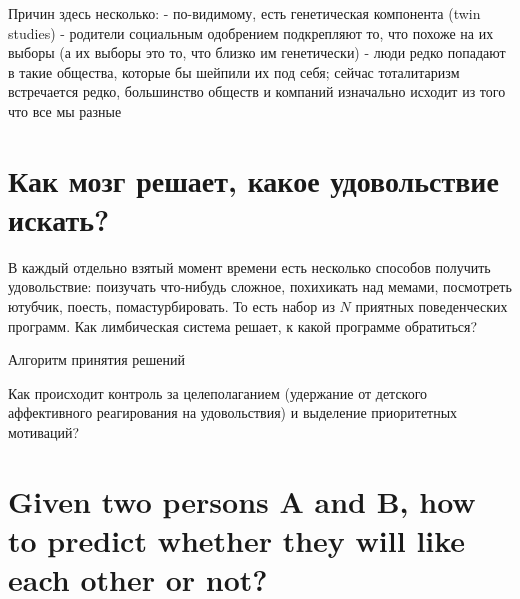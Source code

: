 \documentclass[11pt]{article}
\theoremstyle{remark}
\theoremstyle{definition}
\begin{document}
Причин здесь несколько:
- по-видимому, есть генетическая компонента (twin studies)
- родители социальным одобрением подкрепляют то, что похоже на их выборы (а их выборы это то, что близко им генетически)
- люди редко попадают в такие общества, которые бы шейпили их под себя; сейчас тоталитаризм встречается редко, большинство обществ и компаний изначально исходит из того что все мы разные












\section{Как мозг решает, какое удовольствие искать?}

В каждый отдельно взятый момент времени есть несколько способов получить удовольствие: поизучать что-нибудь сложное, похихикать над мемами, посмотреть ютубчик, поесть, помастурбировать. То есть набор из $N$ приятных поведенческих программ. Как лимбическая система решает, к какой программе обратиться? 

Алгоритм принятия решений

Как происходит контроль за целеполаганием (удержание от детского аффективного реагирования на удовольствия) и выделение приоритетных мотиваций?



\section{Given two persons A and B, how to predict whether they will like each other or not?}
\end{document}
